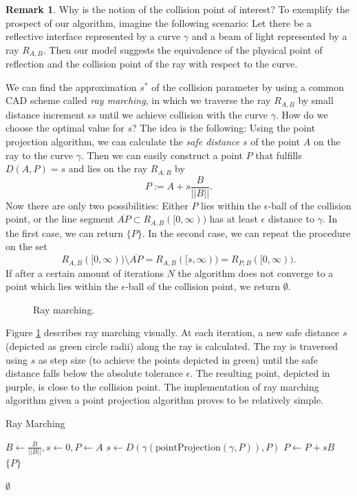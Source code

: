 \documentclass[a4paper, 11pt]{report}
\theoremstyle{definition}
\newtheorem*{remark}{Remark}
\renewcommand{\emph}[1]{\textit{#1}}
\begin{document}
	\begin{remark}
		Why is the notion of the collision point of interest? To exemplify the prospect of our algorithm, imagine the following scenario: Let there be a reflective interface represented by a curve $\gamma$ and a beam of light represented by a ray $R_{A,B}$. Then our model suggests the equivalence of the physical point of reflection and the collision point of the ray with respect to the curve.
	\end{remark}

	We can find the approximation $s^*$ of the collision parameter by using a common CAD scheme called \emph{ray marching}, in which we traverse the ray $R_{A,B}$ by small distance increment s$s$ until we achieve collision with the curve $\gamma$. How do we choose the optimal value for $s$? The idea is the following: Using the point projection algorithm, we can calculate the \emph{safe distance} $s$ of the point $A$ on the ray to the curve $\gamma$. Then we can easily construct a point $P$ that fulfills $D(A,P) = s$ and lies on the ray $R_{A,B}$ by 
		$$ P := A+s\frac{B}{||B||}.$$
	Now there are only two possibilities: Either $P$ lies within the $\epsilon$-ball of the collision point, or the line segment $\overline{AP} \subset R_{A,B}([0,\infty))$ has at least $\epsilon$ distance to $\gamma$. In the first case, we can return $\{P\}$. In the second case, we can repeat the procedure on the set 
		$$ R_{A,B}([0,\infty)) \setminus \overline{AP} = R_{A,B}([s,\infty)) = R_{P,B}([0,\infty)).$$
	If after a certain amount of iterations $N$ the algorithm does not converge to a point which lies within the $\epsilon$-ball of the collision point, we return $\emptyset$.

	\begin{figure}[H]
		\centering
		
		\caption{Ray marching.}
		\label{fig:raymarchingvis}
	\end{figure}

	Figure \ref{fig:raymarchingvis} describes ray marching visually. At each iteration, a new safe distance $s$ (depicted as green circle radii) along the ray is calculated. The ray is traversed using $s$ as step size (to achieve the points depicted in green) until the safe distance falls below the absolute tolerance $\epsilon$. The resulting point, depicted in purple, is close to the collision point. The implementation of ray marching algorithm given a point projection algorithm proves to be relatively simple.

	\begin{algorithm}[H]
		\begin{algorithmic}[1]

			\caption{Ray Marching}\label{alg:raymarching}
				\State $B \gets \frac{B}{||B||}, s \gets 0, P \gets A$
					\State $s \gets D(\gamma(\text{pointProjection}(\gamma, P)), P)$
					\State $P \gets P + sB$
						\State \Return $\{P\}$
					\EndIf
				\EndFor

				\State \Return $\emptyset$
			\EndProcedure
		\end{algorithmic}
	\end{algorithm}
\end{document}
